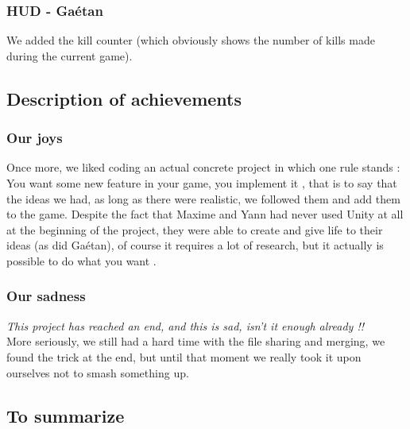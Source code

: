 \documentclass[12pt]{article}
\begin{document}
        \subsubsection{HUD - Ga\'etan}
        
        We added the kill counter (which obviously shows the number of kills made during the current game).\\
        
	\subsection{Description of achievements}
        
        \subsubsection{Our joys}
        
        Once more, we liked coding an actual concrete project in which one rule stands : \guillemotleft \space You want some new feature in your game, you implement it \guillemotright, that is to say that the ideas we had, as long as there were realistic, we followed them and add them to the game. Despite the fact that Maxime and Yann had never used Unity at all at the beginning of the project, they were able to create and give life to their ideas (as did Ga\'etan), of course it requires a lot of research, but it actually is possible to \guillemotleft \space do what you want \guillemotright.
        
        \subsubsection{Our sadness}
        
        \textit{This project has reached an end, and this is sad, isn't it enough already !!}\\
        
        More seriously, we still had a hard time with the file sharing and merging, we found the trick at the end, but until that moment we really took it upon ourselves not to smash something up.
        
    \subsection{To summarize}
    
\end{document}
